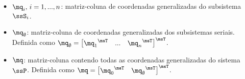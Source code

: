\documentclass[]{politex}
\begin{document}
\begin{itemize}
\item $\mq_i, \,i=1, ..., n$: matriz-coluna de coordenadas generalizadas do subsistema $\ssS_i$.
\item $\mq_\emptyset$: matriz-coluna de coordenadas generalizadas dos subsistemas seriais. Definida como $\mq_\emptyset = \begin{bmatrix}  {\mq_1}^\msT & ... & {\mq_{n}}^\msT \end{bmatrix}^\msT $.
\item $\mq$: matriz-coluna contendo todas as coordenadas generalizadas do sistema $\ssP$. Definida como $\mq = \begin{bmatrix} {\mq_0}^\msT & {\mq_\emptyset}^\msT \end{bmatrix}^\msT $.

\end{itemize}
\end{document}
